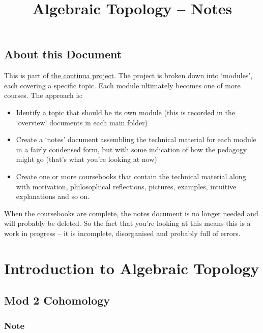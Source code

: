 \documentclass[oneside,english]{amsbook}
\numberwithin{section}{chapter}
\theoremstyle{plain}
\theoremstyle{definition}
\begin{document}
	
	\title{Algebraic Topology -- Notes}
	
	\maketitle
	
	\tableofcontents
	
	\chapter*{About this Document}
	
	This is part of \href{https://github.com/FineArtMaths/continua}{the continua project}. The project is broken down into `modules', each covering a specific topic. Each module ultimately becomes one of more courses. The approach is:
	
	\begin{itemize}
		\item{Identify a topic that should be its own module (this is recorded in the `overview' documents in each main folder)}
		\item{Create a `notes' document assembling the technical material for each module in a fairly condensed form, but with some indication of how the pedagogy might go (that's what you're looking at now)}
		\item{Create one or more coursebooks that contain the technical material along with motivation, philosophical reflections, pictures, examples, intuitive explanations and so on.}
	\end{itemize}
	
	When the coursebooks are complete, the notes document is no longer needed and will probably be deleted. So the fact that you're looking at this means this is a work in progress -- it is incomplete, disorganised and probably full of errors.
	
	\part{Introduction to Algebraic Topology}
	
	\chapter{Mod 2 Cohomology}

	\section*{Note}
\end{document}
